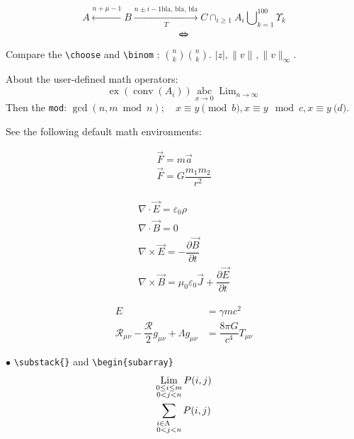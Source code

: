 \documentclass[a4paper,12pt]{amsart}
\theoremstyle{plain}
\theoremstyle{definition}
\theoremstyle{remark}
\numberwithin{equation}{section} %
\newcommand{\calR}{\mathcal{R}}
\DeclareMathOperator*{\Lim}{Lim}
\DeclareMathOperator*{\intersect}{\cap}
\DeclareMathOperator*{\Union}{\bigcup}
\DeclareMathOperator{\ex}{ex}
\DeclareMathOperator{\co}{conv}
\providecommand{\abs}[1]{\lvert#1\rvert}
\providecommand{\norm}[2][]{\lVert#2\rVert_{#1}}
\begin{document}
\begin{equation}\label{eq:arrow}
	A \xleftarrow{n+\mu-1} B \xrightarrow[T]{n\pm i-1 \text{bla, bla, bla}}	C \intersect_{i\geq 1} A_{i} \Union_{k=1}^{100}\Upsilon_{k}
\end{equation}
\[ \Leftarrow \mspace{-18.0mu} \Rightarrow \] %

Compare the \verb|\choose| and \verb|\binom| : $ {n \choose k} \binom{n}{k}$. $ \abs{z}, \norm{v}, \norm[\infty]{v} $.

About the user-defined math operators:
\[ \ex(\co(A_{i})) \operatorname*{abc}_{x\to 0} \Lim_{n\to \infty}\]
Then the \verb|mod|: $ \gcd(n,m\bmod n); \quad x \equiv y \pmod b, x \equiv y \mod c, x \equiv y \pod d $.

See the following default math environments:

\begin{multline}\label{eq:newton}
	\vec{F} = m\vec{a} \\
	\vec{F} = G \dfrac{m_{1}m_{2}}{r^{2}}
\end{multline}

\begin{subequations}\label{eq:maxwell}
	\begin{gather}
		\nabla\cdot \vec{E} = \varepsilon_{0}\rho \\
		\nabla \cdot \vec{B} = 0 \\
		\nabla \times \vec{E} = -\dfrac{\partial \vec{B}}{\partial t}\\
		\nabla \times \vec{B} = \mu_{0}\varepsilon_{0} \vec{J} + \dfrac{\partial \vec{E}}{\partial t}
	\end{gather}
\end{subequations}

\begin{equation}\label{eq:einstein}
	\begin{split}
		E& =\gamma mc^{2}
		\\
		\calR_{\mu\nu} - \dfrac{\calR}{2}g_{\mu\nu} + \Lambda g_{\mu\nu} & = \dfrac{8\pi G}{c^{4}} T_{\mu\nu}
	\end{split}
\end{equation}

$\bullet$ \verb|\substack{}| and \verb|\begin{subarray}|
\begin{gather}
	\Lim_{\substack{0\leq i \leq m\\ 0<j<n} } P(i,j)\\
	\sum_{\begin{subarray}{r}
			i\in \Lambda \\ 0<j<n
		\end{subarray}} P(i,j)
\end{gather}
\end{document}

